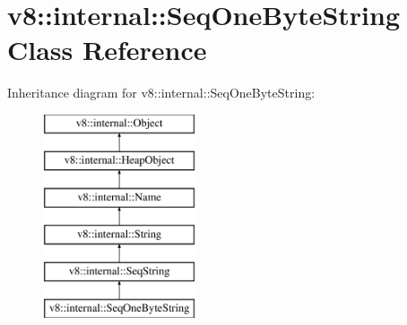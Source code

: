 \hypertarget{classv8_1_1internal_1_1_seq_one_byte_string}{}\section{v8\+:\+:internal\+:\+:Seq\+One\+Byte\+String Class Reference}
\label{classv8_1_1internal_1_1_seq_one_byte_string}
Inheritance diagram for v8\+:\+:internal\+:\+:Seq\+One\+Byte\+String\+:\begin{figure}[H]
\begin{center}
\leavevmode
\includegraphics[height=6.000000cm]{classv8_1_1internal_1_1_seq_one_byte_string}
\end{center}
\end{figure}
